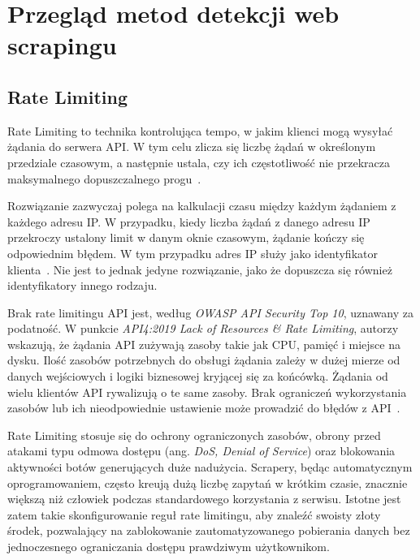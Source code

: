 \newpage


\section{Przegląd metod detekcji web scrapingu}\label{sec:przeglad-rozwiazan}

\subsection{Rate Limiting}\label{subsec:rate-limiting}

Rate Limiting to technika kontrolująca tempo, w jakim klienci mogą wysyłać żądania do serwera API\@.
W tym celu zlicza się liczbę żądań w określonym przedziale czasowym, a następnie ustala, czy ich częstotliwość nie przekracza maksymalnego dopuszczalnego progu~\cite{api-rate-limit-adoption}.

Rozwiązanie zazwyczaj polega na kalkulacji czasu między każdym żądaniem z każdego adresu IP\@.
W przypadku, kiedy liczba żądań z danego adresu IP przekroczy ustalony limit w danym oknie czasowym, żądanie kończy się odpowiednim błędem.
W tym przypadku adres IP służy jako identyfikator klienta~\cite{cloudflare-what-is-rate-limiting}.
Nie jest to jednak jedyne rozwiązanie, jako że dopuszcza się również identyfikatory innego rodzaju.

Brak rate limitingu API jest, według \emph{OWASP API Security Top 10}, uznawany za podatność.
W punkcie \emph{API4:2019 Lack of Resources \& Rate Limiting}, autorzy wskazują, że
żądania API zużywają zasoby takie jak CPU, pamięć i miejsce na dysku.
Ilość zasobów potrzebnych do obsługi żądania zależy w dużej mierze od danych wejściowych i logiki biznesowej kryjącej się za końcówką.
Żądania od wielu klientów API rywalizują o te same zasoby.
Brak ograniczeń wykorzystania zasobów lub ich nieodpowiednie ustawienie może prowadzić do błędów z API~\cite{owasp-api-security-top-10}.

Rate Limiting stosuje się do ochrony ograniczonych zasobów, obrony przed atakami typu odmowa dostępu (ang. \emph{DoS, Denial of Service})
oraz blokowania aktywności botów generujących duże nadużycia.
Scrapery, będąc automatycznym oprogramowaniem, często kreują dużą liczbę zapytań w krótkim czasie, znacznie większą niż człowiek podczas standardowego korzystania z serwisu.
Istotne jest zatem takie skonfigurowanie reguł rate limitingu, aby znaleźć swoisty złoty środek, pozwalający na zablokowanie zautomatyzowanego pobierania danych bez jednoczesnego ograniczania dostępu prawdziwym użytkownikom.


